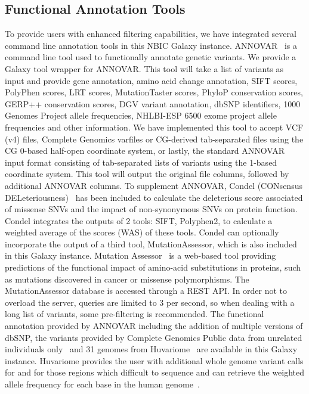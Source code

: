 \documentclass[10pt]{bmc_article}
\newenvironment{bmcformat}{\begin{raggedright}\baselineskip20pt\sloppy\setboolean{publ}{false}}{\end{raggedright}\baselineskip20pt\sloppy}
\begin{document}
\begin{bmcformat}
\subsection*{Functional Annotation Tools}
To provide users with enhanced filtering capabilities, we have integrated several command line annotation tools in this NBIC Galaxy instance. ANNOVAR~\cite{annovar} is a command line tool used to functionally annotate genetic variants. We provide a Galaxy tool wrapper for ANNOVAR. This tool will take a list of variants as input and provide gene annotation, amino acid change annotation, SIFT scores, PolyPhen scores, LRT scores, MutationTaster scores, PhyloP conservation scores, GERP++ conservation scores, DGV variant annotation, dbSNP identifiers, 1000 Genomes Project allele frequencies, NHLBI-ESP 6500 exome project allele frequencies and other information.  We have implemented this tool to accept VCF (v4) files, Complete Genomics varfiles or CG-derived tab-separated files using the CG 0-based half-open coordinate system, or lastly, the standard ANNOVAR input format consisting of tab-separated lists of variants using the 1-based coordinate system.  This tool will output the original file columns, followed by additional ANNOVAR columns.  To supplement ANNOVAR, Condel (CONsensus DELeteriousness)~\cite{condel} has been included to calculate the deleterious score associated of missense SNVs and the impact of non-synonymous SNVs on protein function. Condel integrates the outputs of 2 tools: SIFT, Polyphen2, to calculate a weighted average of the scores (WAS) of these tools. Condel can optionally incorporate the output of a third tool, MutationAssessor, which is also included in this Galaxy instance. Mutation Assessor~\cite{mutass} is a web-based tool providing predictions of the functional impact of amino-acid substitutions in proteins, such as mutations discovered in cancer or missense polymorphisms. The MutationAssessor database is accessed through a REST API.  In order not to overload the server, queries are limited to 3 per second, so when dealing with a long list of variants, some pre-filtering is recommended. The functional annotation provided by ANNOVAR including the addition of multiple versions of dbSNP, the variants provided by Complete Genomics Public data from unrelated individuals only~\cite{url-cgftp} and 31 genomes from Huvariome~\cite{huvariome} are available in this Galaxy instance. Huvariome provides the user with additional whole genome variant calls for and for those regions which difficult to sequence and can retrieve the weighted allele frequency for each base in the human genome~\cite{huvariome}.   


\end{bmcformat}
\end{document}
